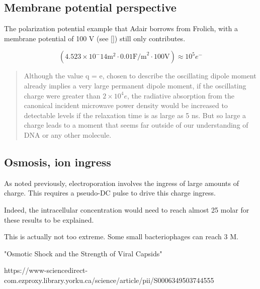 \documentclass[paper.tex]{subfiles}
\begin{document}
\subsection{Membrane potential perspective}


The polarization potential example that Adair borrows from Frolich, with a membrane potential of 100 V (see []) still only contributes.  

$$(4.523 \times 10^-14 \text{m}^2 \cdot 0.01 \text{F/m}^2 \cdot 100 \text{V}) \approx 10^5 e^- $$



\cite{Vibrational2002}
\begin{quote}
	Although the value q = e, chosen to describe the oscillating dipole moment already implies a very large permanent dipole moment, if the oscillating charge were greater
	than $2\times 10^4 e$, the radiative absorption from the canonical
	incident microwave power density would be increased to
	detectable levels if the relaxation time is as large as 5 ns.
	But so large a charge leads to a moment that seems far
	outside of our understanding of DNA or any other molecule.
	
	

\end{quote}


\subsection{Osmosis, ion ingress}

As noted previously, electroporation involves the ingress of large amounts of charge. This requires a pseudo-DC pulse to drive this charge ingress.



Indeed, the intracellular concentration would need to reach almost 25 molar for these results to be explained.

This is actually not too extreme. Some small bacteriophages can reach 3 M.

"Osmotic Shock and the Strength of Viral Capsids"

https://www-sciencedirect-com.ezproxy.library.yorku.ca/science/article/pii/S0006349503744555
\end{document}
